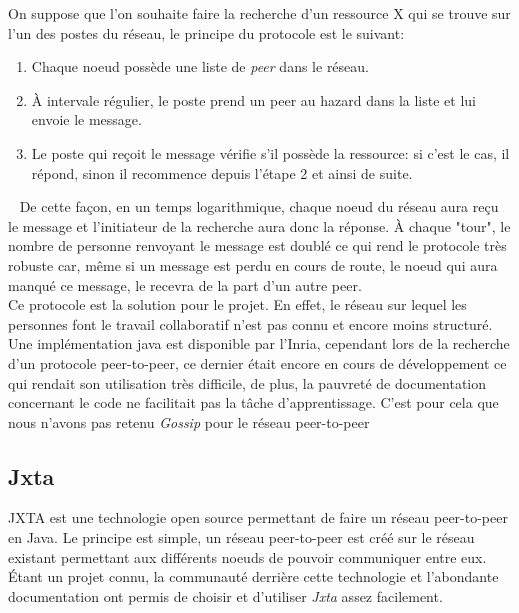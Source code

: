 		On suppose que l'on souhaite faire la recherche d'un ressource X qui se trouve sur l'un des postes du réseau, le principe du protocole est le suivant:
		\begin{enumerate}
			\item Chaque noeud possède une liste de \emph{peer} dans le réseau.
			\item À intervale régulier, le poste prend un peer au hazard dans la liste et lui envoie le message.
			\item Le poste qui reçoit le message vérifie s'il possède la ressource: si c'est le cas, il répond, sinon il recommence depuis l'étape 2 et ainsi de suite.
		\end{enumerate}~
		De cette façon, en un temps logarithmique, chaque noeud du réseau aura reçu le message et l'initiateur de la recherche aura donc la réponse. À chaque "tour", le nombre de personne renvoyant le message est doublé ce qui rend le protocole très robuste car, même si un message est perdu en cours de route, le noeud qui aura manqué ce message, le recevra de la part d'un autre peer.\\
		
		Ce protocole est la solution pour le projet. En effet, le réseau sur lequel les personnes font le travail collaboratif n'est pas connu et encore moins structuré. Une implémentation java est disponible par l'Inria, cependant lors de la recherche d'un protocole peer-to-peer, ce dernier était encore en cours de développement ce qui rendait son utilisation très difficile, de plus, la pauvreté de documentation concernant le code ne facilitait pas la tâche d'apprentissage. C'est pour cela que nous n'avons pas retenu \emph{Gossip} pour le réseau peer-to-peer
	
	\subsection{Jxta}
		JXTA est une technologie open source permettant de faire un réseau peer-to-peer en Java. Le principe est simple, un réseau peer-to-peer est créé sur le réseau existant permettant aux différents noeuds de pouvoir communiquer entre eux.\\
		
		Étant un projet connu, la communauté derrière cette technologie et l'abondante documentation ont permis de choisir et d'utiliser \emph{Jxta} assez facilement.
